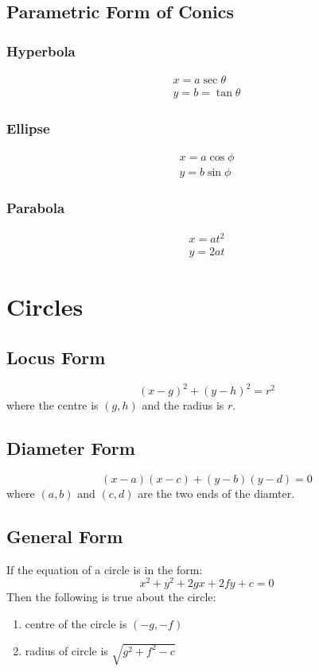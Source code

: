 \documentclass[openany, oneside]{book}
\begin{document}
\section{Parametric Form of Conics}
\small{\subsection{Hyperbola}}
\begin{align}
x=a\sec \theta\\
y=b=\tan \theta
\end{align}
\small{\subsection{Ellipse}}
\begin{align}
x=a\cos\phi\\
y=b\sin\phi
\end{align}
\small{\subsection{Parabola}}
\begin{align}
x=at^2\\
y=2at
\end{align}


\large{\chapter{Circles}}

\section{Locus Form}
\begin{equation}
(x-g)^2+(y-h)^2=r^2
\end{equation}
where the centre is $(g,h)$ and the radius is $r$.

\section{Diameter Form}
\begin{equation}
(x-a)(x-c)+(y-b)(y-d)=0
\end{equation}
where $(a,b)$ and $(c,d)$ are the two ends of the diamter.

\section{General Form}
If the equation of a circle is in the form:
\begin{equation}
x^2+y^2+2gx+2fy+c=0
\end{equation}
Then the following is true about the circle:
\begin{enumerate}
\item centre of the circle is $(-g,-f)$
\item radius of circle is $\sqrt{g^2+f^2-c}$
\end{enumerate}
\end{document}
